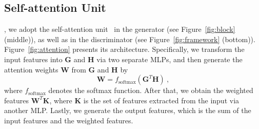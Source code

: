 
%




\subsection{Self-attention Unit}
\label{subsec:attention}

, we adopt the self-attention unit~\cite{zhang2019self} in the generator (see Figure~\ref{fig:block} (middle)), as well as in the discriminator (see Figure~\ref{fig:framework} (bottom)).
%
Figure~\ref{fig:attention} presents its architecture.
%
Specifically, we transform the input features into $\mathbf{G}$ and $\mathbf{H}$ via two separate MLPs, and then generate the attention weights $\mathbf{W}$ from $\mathbf{G}$ and $\mathbf{H}$ by
%
\begin{equation}
\mathbf{W} = f_{\text{softmax}}(\mathbf{G}^T \mathbf{H}) \ ,
\end{equation}
%
where $f_{\text{softmax}}$ denotes the softmax function.
After that, we obtain the weighted features $\mathbf{W}^T\mathbf{K}$, where $\mathbf{K}$ is the set of features extracted from the input via another MLP.
Lastly, we generate the output features, which is the sum of the input features and the weighted features.


%
%

